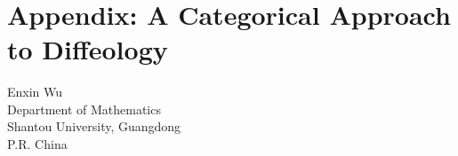 

\newcommand{\uA}{\underline{A}}

\newtheorem{definition}{Definition}
\newtheorem{corollary}[definition]{Corollary}
\newtheorem{theorem}[definition]{Theorem}

\theoremstyle{remark}
\newtheorem{remark}[definition]{Remark}
\newtheorem{example}[definition]{Example}

\newcommand{\op}{\mathrm{op}}
\newcommand{\CCov}{\mathrm{Cov}}

\newcommand{\Set}{\mathfrak{Set}}
\newcommand{\sSet}{\mathfrak{sSet}}
\newcommand{\CCh}{\mathfrak{Ch}}

\renewcommand{\Top}{\mathfrak{Top}}
\renewcommand{\Diff}{\mathfrak{Diff}}

\newcommand{\Vect}{\mathfrak{Vect}}
\newcommand{\DVPB}{\mathfrak{Dvpb}}
\newcommand{\Pre}{\mathfrak{Pre}}
\newcommand{\Sh}{\mathfrak{Sh}}
\newcommand{\CCSh}{\mathfrak{CSh}}

\renewenvironment{proof}{\textit{proof}.}{~$\square$}

\def \infty{\inftyreg}

\newcommand{\colim}{\mathrm{colim}}


\newpage
\markright{\ }
\
\newpage

\setcounter{footnote}{0}

\chapter*{Appendix: A Categorical Approach to Diffeology}
\vspace{-3ex}
\begin{center}
  Enxin Wu \\
  Department of Mathematics \\
  Shantou University, Guangdong \\
  P.R. China
\end{center}

